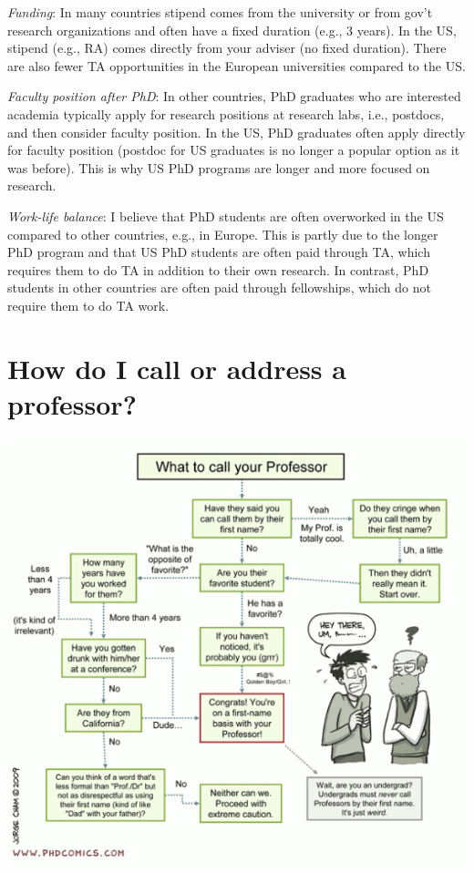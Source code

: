 \documentclass[oneside,11pt]{memoir}
\begin{document}
\emph{Funding}:  In many countries stipend comes from the university or from gov't research organizations and often have a fixed duration (e.g., 3 years).  In the US, stipend (e.g., RA) comes directly from your adviser (no fixed duration).  There are also fewer TA opportunities in the European universities compared to the US.

\emph{Faculty position after PhD}: In other countries, PhD graduates who are interested academia typically apply for research positions at research labs, i.e., postdocs, and then consider faculty position. In the US, PhD graduates often apply directly for faculty position (postdoc for US graduates is no longer a popular option as it was before).  This is why US PhD programs are longer and more focused on research.

\emph{Work-life balance}: I believe that PhD students are often overworked in the US compared to other countries, e.g., in Europe.  This is partly due to the longer PhD program and that US PhD students are often paid through TA, which requires them to do TA in addition to their own research. In contrast, PhD students in other countries are often paid through fellowships, which do not require them to do TA work.

\section{How do I call or address a professor?}\label{sec:address}

\begin{center}
\includegraphics[scale=0.6]{c5.png}
\end{center}
\end{document}
